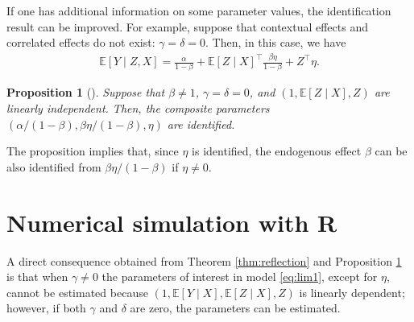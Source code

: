 \documentclass[10.5pt, A4paper, openany, uplatex]{book}
\newcommand{\R}{\textbf{R}}
\newcommand{\E}{\mathbb{E}}
\newtheorem{proposition}[theorem]{Proposition}
{\theorembodyfont{\upshape}
\newtheorem{remark}{Remark}
}
\numberwithin{equation}{section}
\begin{document}
If one has additional information on some parameter values, the identification result can be improved.
For example, suppose that contextual effects and correlated effects do not exist: $\gamma = \delta = 0$. Then, in this case, we have
\begin{align*}
	\E[Y \mid Z, X] = \frac{\alpha}{1 -\beta} + \E[Z \mid X]^\top\frac{\beta \eta}{1 - \beta} + Z^\top \eta .
\end{align*}
\begin{proposition}[\cite{manski1993identification}]\label{prop:reflection2} 
	Suppose that $\beta \neq 1$, $\gamma = \delta = 0$, and $(1, \E[Z \mid X], Z)$ are linearly independent. 
	Then, the composite parameters $(\alpha/(1 -\beta),  \beta \eta/(1 - \beta), \eta)$ are identified.
\end{proposition}

The proposition implies that, since $\eta$ is identified, the endogenous effect $\beta$ can be also identified from $\beta \eta / (1 - \beta)$ if $\eta \neq 0$.

\section{Numerical simulation with \R}

A direct consequence obtained from Theorem \ref{thm:reflection} and Proposition \ref{prop:reflection2} is that when $\gamma \neq 0$ the parameters of interest in model \eqref{eq:lim1}, except for $\eta$, cannot be estimated because $(1, \E[Y \mid X], \E[Z \mid X], Z)$ is linearly dependent; however, if both $\gamma$ and $\delta$ are zero, the parameters can be estimated.
\end{document}
